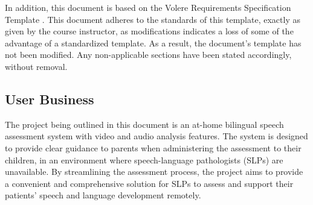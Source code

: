 \documentclass[12pt]{article}
\begin{document}
\noindent\hspace{2em}In addition, this document is based on the Volere Requirements Specification Template \cite{volere}. This document adheres to the standards of this template,
exactly as given by the course instructor, as modifications indicates a loss of some of the advantage of a standardized template. As a result, the document's
template has not been modified. Any non-applicable sections have been stated accordingly, without removal.

\subsection{User Business}
\hspace{2em}The project being outlined in this document is an at-home bilingual speech 
assessment system with video and audio analysis features. The system is designed 
to provide clear guidance to parents when administering the assessment to their 
children, in an environment where speech-language pathologists (SLPs) are 
unavailable. By streamlining the assessment process, the project aims to provide a 
convenient and comprehensive solution for SLPs to assess and support their patients'
speech and language development remotely. 
\end{document}
